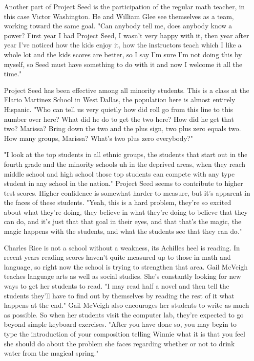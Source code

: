 Another part of Project Seed is the participation of the regular math teacher, in this case Victor Washington. He and William Glee see themselves as a team, working toward the same goal. "Can anybody tell me, does anybody know a power? First year I had Project Seed, I wasn't very happy with it, then year after year I've noticed how the kids enjoy it, how the instructors teach which I like a whole lot and the kids scores are better, so I say I'm sure I'm not doing this by myself, so Seed must have something to do with it and now I welcome it all the time."

Project Seed has been effective among all minority students. This is a class at the Elario Martinez School in West Dallas, the population here is almost entirely Hispanic. "Who can tell us very quietly how did roll go from this line to this number over here? What did he do to get the two here? How did he get that two? Marissa? Bring down the two and the plus sign, two plus zero equals two. How many groups, Marissa? What's two plus zero everybody?"

"I look at the top students in all ethnic groups, the students that start out in the fourth grade and the minority schools uh in the deprived areas, when they reach middle school and high school those top students can compete with any type student in any school in the nation." Project Seed seems to contribute to higher test scores. Higher confidence is somewhat harder to measure, but it's apparent in the faces of these students. "Yeah, this is a hard problem, they're so excited about what they're doing, they believe in what they're doing to believe that they can do, and it's just that that goal in their eyes, and that that's the magic, the magic happens with the students, and what the students see that they can do."

Charles Rice is not a school without a weakness, its Achilles heel is reading. In recent years reading scores haven't quite measured up to those in math and language, so right now the school is trying to strengthen that area. Gail McVeigh teaches language arts as well as social studies. She's constantly looking for new ways to get her students to read. "I may read half a novel and then tell the students they'll have to find out by themselves by reading the rest of it what happens at the end." Gail McVeigh also encourages her students to write as much as possible. So when her students visit the computer lab, they're expected to go beyond simple keyboard exercises. "After you have done so, you may begin to type the introduction of your composition telling Winnie what it is that you feel she should do about the problem she faces regarding whether or not to drink water from the magical spring."

